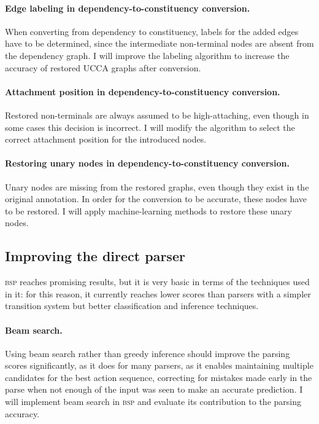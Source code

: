 \documentclass[12pt]{article}
\begin{document}
\paragraph{Edge labeling in dependency-to-constituency conversion.}
When converting from dependency to constituency, labels for the
added edges have to be determined, since the intermediate non-terminal nodes are absent
from the dependency graph. I will improve the labeling algorithm to
increase the accuracy of restored UCCA graphs after conversion.

\paragraph{Attachment position in dependency-to-constituency conversion.}
Restored non-terminals are always assumed to be high-attaching, even though
in some cases this decision is incorrect.
I will modify the algorithm to select the correct attachment position for the introduced nodes.

\paragraph{Restoring unary nodes in dependency-to-constituency conversion.}
Unary nodes are missing from the restored graphs, even though they exist in the
original annotation. In order for the conversion to be accurate, these nodes have to
be restored.
I will apply machine-learning methods \cite{fernandez2015parsing} to restore these unary nodes.

\subsection{Improving the direct parser}\label{sec:improving_bsp}
\textsc{bsp} reaches promising results, but it is very basic in terms of the
techniques used in it: for this reason, it currently reaches lower scores than parsers
with a simpler transition system but better classification and inference techniques.

\paragraph{Beam search.}
Using beam search rather than greedy inference should improve the parsing
scores significantly, as it does for many parsers, as it enables maintaining multiple candidates
for the best action sequence, correcting for mistakes made early in the parse when
not enough of the input was seen to make an accurate prediction.
I will implement beam search in \textsc{bsp} and evaluate its contribution to the parsing accuracy.
\end{document}
